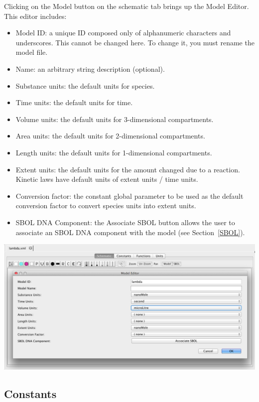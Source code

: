 \documentclass[titlepage,11pt]{article}
\begin{document}
\noindent
Clicking on the Model button on the schematic tab brings up the Model Editor.  This editor includes:
\begin{itemize}
\item Model ID: a unique ID composed only of alphanumeric characters and underscores.  This cannot be changed here.  To change it, you must rename the model file.
\item Name: an arbitrary string description (optional).
\item Substance units: the default units for species.
\item Time units: the default units for time.
\item Volume units: the default units for 3-dimensional compartments.
\item Area units: the default units for 2-dimensional compartments.
\item Length units: the default units for 1-dimensional compartments.
\item Extent units: the default units for the amount changed due to a reaction.  Kinetic laws have default units of extent units / time units.  
\item Conversion factor: the constant global parameter to be used as the default conversion factor to convert species units into extent units.
\item SBOL DNA Component: the Associate SBOL button allows the user to associate an SBOL DNA component with the model (see Section~\ref{SBOL}).
\end{itemize}

\begin{center}
\includegraphics[width=160mm]{screenshots/ModelUnits}
\end{center}

\clearpage

\subsection{\label{Constants}Constants}
\end{document}
